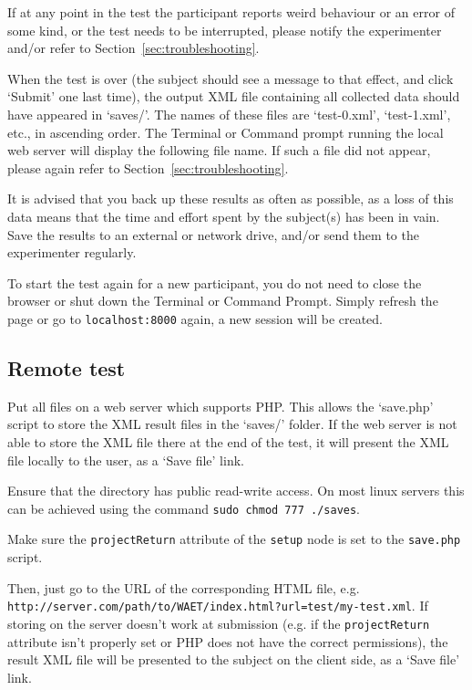 \documentclass[11pt, oneside]{article}   	%
\begin{document}
        If at any point in the test the participant reports weird behaviour or an error of some kind, or the test needs to be interrupted, please notify the experimenter and/or refer to Section~\ref{sec:troubleshooting}.
		
		When the test is over (the subject should see a message to that effect, and click `Submit' one last time), the output XML file containing all collected data should have appeared in `saves/'. The names of these files are `test-0.xml', `test-1.xml', etc., in ascending order. The Terminal or Command prompt running the local web server will display the following file name. If such a file did not appear, please again refer to Section~\ref{sec:troubleshooting}. 
		
		It is advised that you back up these results as often as possible, as a loss of this data means that the time and effort spent by the subject(s) has been in vain. Save the results to an external or network drive, and/or send them to the experimenter regularly. 
		
		To start the test again for a new participant, you do not need to close the browser or shut down the Terminal or Command Prompt. Simply refresh the page or go to \texttt{localhost:8000} again, a new session will be created.
		

	\subsection{Remote test}
		Put all files on a web server which supports PHP. This allows the `save.php' script to store the XML result files in the `saves/' folder. If the web server is not able to store the XML file there at the end of the test, it will present the XML file locally to the user, as a `Save file' link.
		
		Ensure that the  directory has public read-write access. On most linux servers this can be achieved using the command \texttt{sudo chmod 777 ./saves}.

		Make sure the \texttt{projectReturn} attribute of the \texttt{setup} node is set to the \texttt{save.php} script. 

		Then, just go to the URL of the corresponding HTML file, e.g. \texttt{http://server.com/path/to/WAET/index.html?url=test/my-test.xml}. If storing on the server doesn't work at submission (e.g. if the \texttt{projectReturn} attribute isn't properly set or PHP does not have the correct permissions), the result XML file will be presented to the subject on the client side, as a `Save file' link. 
\end{document}

